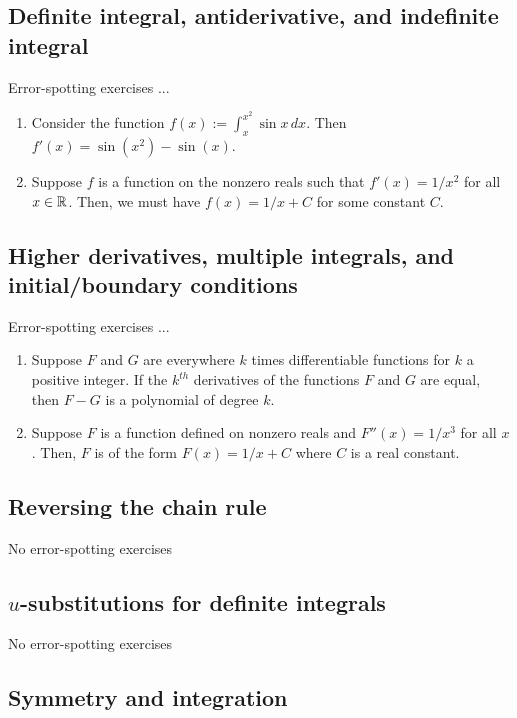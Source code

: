 \documentclass[10pt]{amsart}
\begin{document}
\subsection{Definite integral, antiderivative, and indefinite integral}

Error-spotting exercises ...

\begin{enumerate}
\item Consider the function $f(x) := \int_x^{x^2} \sin x \, dx$. Then
  $f'(x) = \sin(x^2) - \sin(x)$.
\item Suppose $f$ is a function on the nonzero reals such that $f'(x)
  = 1/x^2$ for all $x \in \mathbb{R}$. Then, we must have $f(x) = 1/x + C$ for
  some constant $C$.
\end{enumerate}

\subsection{Higher derivatives, multiple integrals, and initial/boundary conditions}

Error-spotting exercises ...

\begin{enumerate}
\item Suppose $F$ and $G$ are everywhere $k$ times differentiable
  functions for $k$ a positive integer. If the $k^{th}$ derivatives of
  the functions $F$ and $G$ are equal, then $F - G$ is a polynomial of
  degree $k$.
\item Suppose $F$ is a function defined on nonzero reals and $F''(x) =
  1/x^3$ for all $x$. Then, $F$ is of the form $F(x) = 1/x + C$ where
  $C$ is a real constant.
\end{enumerate}
\subsection{Reversing the chain rule}

No error-spotting exercises

\subsection{$u$-substitutions for definite integrals}

No error-spotting exercises

\subsection{Symmetry and integration}
\end{document}
